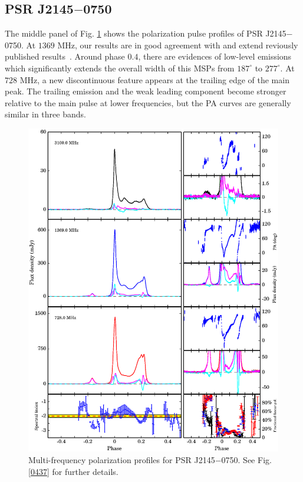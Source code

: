 \documentclass[useAMS,usenatbib]{mn2e}
\begin{document}
\subsection{PSR J2145$-$0750}

The middle panel of Fig. \ref{2145} shows the polarization pulse profiles of 
PSR J2145$-$0750.
%
At $1369$ MHz, our results are in good agreement with and extend reviously 
published results~\citep{Yan11}.
%
Around phase $0.4$, there are evidences of low-level emissions which 
significantly extends the overall width of this MSPs from $187^{\circ}$ to 
$277^{\circ}$.
%
At $728$ MHz, a new discontinuous feature appears at the trailing edge of 
the main peak. 
%
The trailing emission and the weak leading component become stronger relative 
to the main pulse at lower frequencies, but the PA curves are generally similar 
in three bands.

\begin{figure}
\begin{center}
\includegraphics[width=6 in]{2145.ps}
\caption{Multi-frequency polarization profiles for PSR J2145$-$0750. 
See Fig. \ref{0437} for further details.}
\label{2145}
\end{center}
\end{figure}
\end{document}
